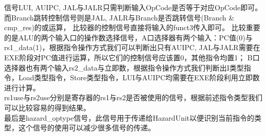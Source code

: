 信号LUI, AUIPC, JAL与JALR只需判断输入OpCode是否等于对应OpCode即可。而Branch跳转控制信号则是JAL, JALR与Branch是否跳转信号(Branch \& cmp\_res)的或运算，
比较器的控制信号直接将输入的funct3传入即可。
比较重要的是ALU的两个输入口的操作数选择信号，A口选择器有两个输入：PC值(0)与rs1\_data(1)，根据指令操作方式我们可以判断出只有AUIPC, JAL与JALR需要在EXE阶段对PC值进行运算，所以它们的控制信号应该置0，其他指令均置1；
B口选择器也有两个输入rs2\_data与立即数，根据指令操作方式我们判断出I类型指令，Load类型指令，Store类型指令，LUI与AUIPC均需要在EXE阶段利用立即数进行计算。 \\
rs1use与rs2use分别是寄存器的rs1与rs2是否被使用的信号，根据前述指令类型我们可以比较容易的得到结果。 \\
最后是hazard\_optype信号，此信号用于传递给HazardUnit以便识别当前指令的类型，这个信号的使用可以减少很多信号的传递。

